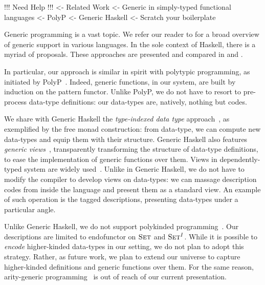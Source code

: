 \begin{wstructure}
!!! Need Help !!!
<- Related Work
    <- Generic in simply-typed functional languages
        <- PolyP \cite{jansson:polyp}
        <- Generic Haskell \cite{hinze:generic-haskell}
        <- Scratch your boilerplate \cite{spj:syb}
\end{wstructure}

Generic programming is a vast topic. We refer our reader to
\citet{garcia:generic-comparative-study} for a broad overview of
generic support in various languages. In the sole context of Haskell,
there is a myriad of proposals. These approaches are presented and
compared in \citet{hinze:generic-approach-comparative} and
\citet{rodriguez:generic-libs-comparative}.

In particular, our approach is similar in spirit with polytypic
programming, as initiated by PolyP~\cite{jansson:polyp}. Indeed,
generic functions, in our system, are built by induction on the
pattern functor. Unlike PolyP, we do not have to resort to pre-process
data-type definitions: our data-types are, natively, nothing but
codes.

We share with Generic Haskell the \emph{type-indexed data type}
approach~\cite{hinze:generic-haskell}, as exemplified by the free
monad construction: from data-type, we can compute new data-types and
equip them with their structure. Generic Haskell also features
\emph{generic views}~\cite{holdermans:generic-view}, transparently
transforming the structure of data-type definitions, to ease the
implementation of generic functions over them. Views in
dependently-typed system are widely
used~\cite{mcbride.mckinna:view-from-the-left}. Unlike in Generic
Haskell, we do not have to modify the compiler to develop views on
data-types: we can massage description codes from inside the language
and present them as a standard view. An example of such operation is
the tagged descriptions, presenting data-types under a particular
angle.

Unlike Generic Haskell, we do not support polykinded
programming~\cite{hinze:polytypic-polykinded}. Our descriptions are
limited to endofunctor on $\Set$ and $\Set^I$. While it is possible to
\emph{encode} higher-kinded data-types in our setting, we do not plan
to adopt this strategy. Rather, as future work, we plan to extend our
universe to capture higher-kinded definitions and generic functions
over them. For the same reason, arity-generic
programming~\cite{weirich:arity-generic} is out of reach of our
current presentation.

